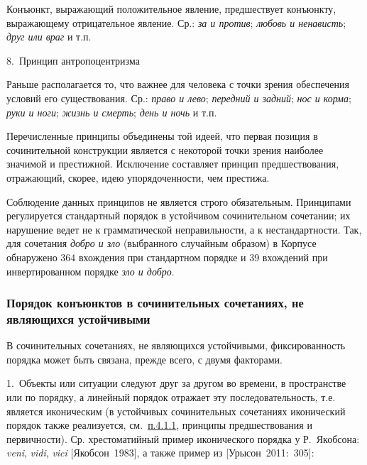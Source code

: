 Конъюнкт, выражающий положительное явление, предшествует конъюнкту,
выражающему отрицательное явление. Ср.: \textit{за и против}; \textit{любовь
и ненависть}; \textit{друг или враг} и т.п.

8.~Принцип антропоцентризма

Раньше располагается то, что важнее для человека с точки зрения
обеспечения условий его существования. Ср.: \textit{право и лево};
\textit{передний и задний}; \textit{нос и корма}; \textit{руки и ноги};
\textit{жизнь и смерть}; \textit{день и ночь} и т.п.

Перечисленные принципы объединены той идеей, что первая позиция в
сочинительной конструкции является с некоторой точки зрения наиболее
значимой и престижной. Исключение составляет принцип предшествования,
отражающий, скорее, идею упорядоченности, чем престижа.

Соблюдение данных принципов не является строго обязательным. Принципами
регулируется стандартный порядок в устойчивом сочинительном сочетании;
их нарушение ведет не к грамматической неправильности, а к
нестандартности. Так, для сочетания \textit{добро и зло} (выбранного
случайным образом) в Корпусе обнаружено 364 вхождения при стандартном
порядке и 39 вхождений при инвертированном порядке \textit{зло и добро}.

\subsubsection{Порядок конъюнктов в сочинительных сочетаниях, не
являющихся
устойчивыми}\label{ux43fux43eux440ux44fux434ux43eux43a-ux43aux43eux43dux44aux44eux43dux43aux442ux43eux432-ux432-ux441ux43eux447ux438ux43dux438ux442ux435ux43bux44cux43dux44bux445-ux441ux43eux447ux435ux442ux430ux43dux438ux44fux445-ux43dux435-ux44fux432ux43bux44fux44eux449ux438ux445ux441ux44f-ux443ux441ux442ux43eux439ux447ux438ux432ux44bux43cux438}

В сочинительных сочетаниях, не являющихся устойчивыми, фиксированность
порядка может быть связана, прежде всего, с двумя факторами.

1.~Объекты или ситуации следуют друг за другом во времени, в
пространстве или по порядку, а линейный порядок отражает эту
последовательность, т.е. является иконическим (в устойчивых
сочинительных сочетаниях иконический порядок также реализуется,
см.~\underline{п.4.1.1}, принципы предшествования и первичности). Ср.
хрестоматийный пример иконического порядка у Р.~Якобсона: \textit{veni},
\textit{vidi}, \textit{vici} {[}Якобсон~1983{]}, а также пример из
{[}Урысон~2011:~305{]}:

